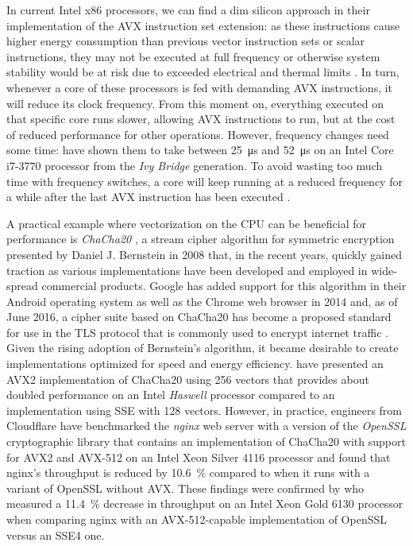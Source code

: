 In current Intel \gls{x86} processors, we can find a dim silicon approach in their implementation of the \gls{AVX} instruction set extension: as these instructions cause higher energy consumption than previous vector instruction sets or scalar instructions, they may not be executed at full frequency or otherwise system stability would be at risk due to exceeded electrical and thermal limits \cite{inteloptimizationmanual}. In turn, whenever a core of these processors is fed with demanding \gls{AVX} instructions, it will reduce its clock frequency. From this moment on, everything executed on that specific core runs slower, allowing \gls{AVX} instructions to run, but at the cost of reduced performance for other operations. However, frequency changes need some time: \citeauthor{mazouz2014evaluation} \cite{mazouz2014evaluation} have shown them to take between \SI{25}{\micro\second} and \SI{52}{\micro\second} on an Intel Core i7-3770 processor from the \textit{Ivy Bridge} generation. To avoid wasting too much time with frequency switches, a core will keep running at a reduced frequency for a while after the last \gls{AVX} instruction has been executed \cite{inteloptimizationmanual}.

A practical example where vectorization on the \gls{CPU} can be beneficial for performance is \emph{ChaCha20} \cite{bernstein2008chacha}, a stream cipher algorithm for symmetric encryption presented by Daniel J. Bernstein in 2008 that, in the recent years, quickly gained traction as various implementations have been developed and employed in wide-spread commercial products. Google has added support for this algorithm in their Android operating system as well as the Chrome web browser in 2014 \cite{googlechacha20} and, as of June 2016, a cipher suite based on ChaCha20 has become a proposed standard for use in the \gls{TLS} protocol that is commonly used to encrypt internet traffic \cite{rfc7905}. Given the rising adoption of Bernstein's algorithm, it became desirable to create implementations optimized for speed and energy efficiency. \citeauthor{goll2014vectorization} \cite{goll2014vectorization} have presented an \gls{AVX2} implementation of ChaCha20 using \SI{256}{\bit} vectors that provides about doubled performance on an Intel \textit{Haswell} processor compared to an implementation using \gls{SSE} with \SI{128}{\bit} vectors. However, in practice, engineers from Cloudflare \cite{cloudflareinteldangers} have benchmarked the \emph{nginx} web server with a version of the \emph{OpenSSL} cryptographic library that contains an implementation of ChaCha20 with support for \gls{AVX2} and \gls{AVX-512} on an Intel Xeon Silver 4116 processor and found that nginx's throughput is reduced by \SI{10.6}{\percent} compared to when it runs with a variant of OpenSSL without \gls{AVX}. These findings were confirmed by \citeauthor{gottschlag19sfma} \cite{gottschlag19sfma} who measured a \SI{11.4}{\percent} decrease in throughput on an Intel Xeon Gold 6130 processor when comparing nginx with an \gls{AVX-512}-capable implementation of OpenSSL versus an \gls{SSE}4 one.

